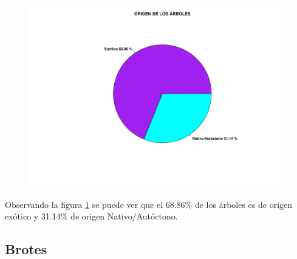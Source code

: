 \documentclass[11pt]{article}
\begin{document}
\begin{figure}[h!]
  \begin{center}
    \includegraphics[width=0.9\linewidth]{pieOrigen.pdf}
    \caption{}
    \label{fig:pieOrigen}
  \end{center}  
\end{figure}

\begin{justify}
  Observando la figura \ref{fig:pieOrigen} se puede ver que el 68.86\% de los
  árboles es de origen exótico y 31.14\% de origen Nativo/Autóctono.
\end{justify}


\newpage
\subsection{Brotes}
\end{document}
